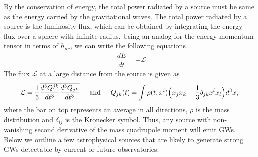 By the conservation of energy, the total power radiated by a source must be same as the energy carried by the gravitational waves. The total power radiated by a source is the luminosity flux, which can be obtained by integrating the energy flux over a sphere with infinite radius. Using an analog for the energy-momentum tensor in terms of $h_{\mu\nu}$, we can write the following equations
\begin{align}
    &\dfrac{dE}{dt} = -\mathcal{L}.
    \label{Eq:energy-equation}
\end{align}
The flux $\mathcal{L}$  at a large distance from the source is given as \cite{Peters:1964zz}
\begin{align}
    \mathcal{L} = \dfrac{1}{5}\overline{\dfrac{d^3Q^{jk}}{dt^3}\dfrac{d^3Q_{jk}}{dt^3}} \hspace{0.5cm} \text{and} \hspace{0.5cm} Q_{jk}(t) = \int \rho(t,x^i)\Big(x_jx_k -\dfrac{1}{3}\delta_{jk}x^lx_l \Big)d^3x,
    \label{Eq:flux-equation}
\end{align}
where the bar on top represents an average in all directions, $\rho$ is the mass distribution and $\delta_{ij}$ is the Kronecker symbol. Thus, any source with non-vanishing second derivative of the mass quadrupole moment will emit GWs. Below we outline a few astrophysical sources that are likely to generate strong GWs detectable by current or future observatories. 


